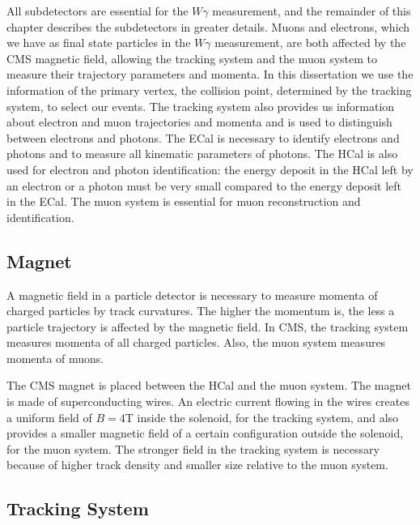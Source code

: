 All subdetectors are essential for the $W\gamma$ measurement, and the remainder of this chapter describes the subdetectors in greater details. Muons and electrons, which we have as final state particles in the $W\gamma$ measurement, are both affected by the CMS magnetic field, allowing the tracking system and the muon system to measure their trajectory parameters and momenta. In this dissertation we use the information of the primary vertex, the collision point, determined by the tracking system, to select our events. The tracking system also provides us information about electron and muon trajectories and momenta and is used to distinguish between electrons and photons. The ECal is necessary to identify electrons and photons and to measure all kinematic parameters of photons. The HCal is also used for electron and photon identification: the energy deposit in the HCal left by an electron or a photon must be very small compared to the energy deposit left in the ECal. The muon system is essential for muon reconstruction and identification.

\subsection{Magnet}

A magnetic field in a particle detector is necessary to measure momenta of charged particles by track curvatures. The higher the momentum is, the less a particle trajectory is affected by the magnetic field. In CMS, the tracking system measures  momenta of all charged particles. Also, the muon system measures momenta of muons. 

The CMS magnet is placed between the HCal and the muon system. The magnet is made of superconducting wires. An electric current flowing in the wires creates a uniform field of $B=4$T inside the solenoid, for the tracking system, and also provides a smaller magnetic field of a certain configuration outside the solenoid, for the muon system. The stronger field in the tracking system is necessary because of higher track density and smaller size relative to the muon system.

\subsection{Tracking System}

